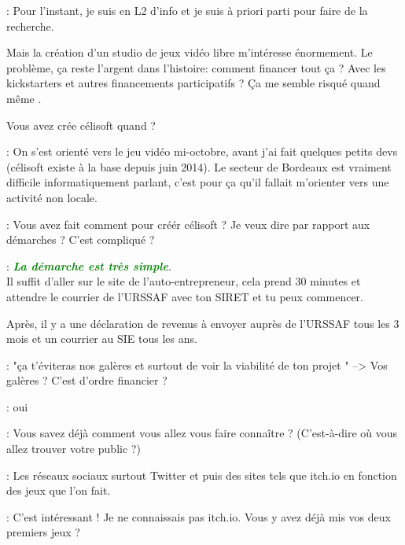 \documentclass[a4paper,12pt, draft]{report}
\newcommand{\goodPoint}[1]{\textcolor{green}{\textbf{\textit{#1}}}}
\begin{document}
\begin{description}
\item 
\item [Question]: Pour l'instant, je suis en L2 d'info et je suis à priori parti pour faire de la recherche.
\item Mais la création d'un studio de jeux vidéo libre m'intéresse énormement. Le problème, ça reste l'argent dans l'histoire: comment financer tout ça ? Avec les kickstarters et autres financements participatifs ? Ça me semble risqué quand même .
\item 
\item Vous avez crée célisoft quand ?
\item 
\item [Réponse]: On s'est orienté vers le jeu vidéo mi-octobre, avant j'ai fait quelques petits devs (célisoft existe à la base depuis juin 2014). Le secteur de Bordeaux est vraiment difficile informatiquement parlant, c'est pour ça qu'il fallait m'orienter vers une activité non locale.
\item 
\item [Question]: Vous avez fait comment pour créér célisoft ? Je veux dire par rapport aux démarches ? C'est compliqué ?
\item 
\item [Réponse]: \goodPoint{La démarche est très simple}. \\Il suffit d'aller sur le site de l'auto-entrepreneur, cela prend 30 minutes et attendre le courrier de l'URSSAF avec ton SIRET et tu peux commencer.
\item Après, il y a une déclaration de revenus à envoyer auprès de l'URSSAF tous les 3 mois et un courrier au SIE tous les ans.
\item 
\item [Question]: "ça t'éviteras nos galères et surtout de voir la viabilité de ton projet " --> Vos galères ? C'est d'ordre financier ?
\item 
\item [Réponse]: oui  
\item 
\item [Question]: Vous savez déjà comment vous allez vous faire connaître ? (C'est-à-dire où vous allez trouver votre public ?)
\item 
\item [Réponse]: Les réseaux sociaux surtout Twitter et puis des sites tels que itch.io en fonction des jeux que l'on fait.
\item 
\item [Question]: C'est intéressant ! Je ne connaissais pas itch.io. Vous y avez déjà mis vos deux premiers jeux ?

\end{description}
\end{document}
